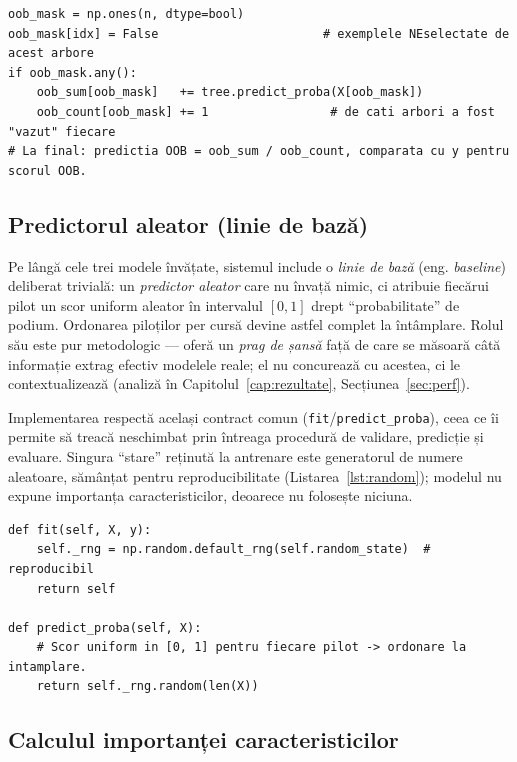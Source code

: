 \documentclass[12pt,a4paper]{report}
\begin{document}
\begin{lstlisting}[caption={Acumularea predictiilor out-of-bag (OOB) pe mostrele neselectate.}, label={lst:oob}]
oob_mask = np.ones(n, dtype=bool)
oob_mask[idx] = False                       # exemplele NEselectate de acest arbore
if oob_mask.any():
    oob_sum[oob_mask]   += tree.predict_proba(X[oob_mask])
    oob_count[oob_mask] += 1                 # de cati arbori a fost "vazut" fiecare
# La final: predictia OOB = oob_sum / oob_count, comparata cu y pentru scorul OOB.
\end{lstlisting}

\subsection{Predictorul aleator (linie de bază)}
\label{sec:implrandom}

Pe lângă cele trei modele învățate, sistemul include o \emph{linie de bază} (eng. \emph{baseline})
deliberat trivială: un \emph{predictor aleator} care nu învață nimic, ci atribuie fiecărui pilot un
scor uniform aleator în intervalul $[0, 1]$ drept ``probabilitate'' de podium. Ordonarea piloților
per cursă devine astfel complet la întâmplare. Rolul său este pur metodologic --- oferă un
\emph{prag de șansă} față de care se măsoară câtă informație extrag efectiv modelele reale; el nu
concurează cu acestea, ci le contextualizează (analiză în Capitolul~\ref{cap:rezultate},
Secțiunea~\ref{sec:perf}).

Implementarea respectă același contract comun (\texttt{fit}/\texttt{predict\_proba}), ceea ce îi
permite să treacă neschimbat prin întreaga procedură de validare, predicție și evaluare. Singura
``stare'' reținută la antrenare este generatorul de numere aleatoare, sămânțat pentru
reproducibilitate (Listarea~\ref{lst:random}); modelul nu expune importanța caracteristicilor,
deoarece nu folosește niciuna.

\begin{lstlisting}[caption={Predictorul aleator: scoruri uniforme, reproducibile prin samanta.}, label={lst:random}]
def fit(self, X, y):
    self._rng = np.random.default_rng(self.random_state)  # reproducibil
    return self

def predict_proba(self, X):
    # Scor uniform in [0, 1] pentru fiecare pilot -> ordonare la intamplare.
    return self._rng.random(len(X))
\end{lstlisting}

\subsection{Calculul importanței caracteristicilor}
\label{sec:implimportanta}
\end{document}
